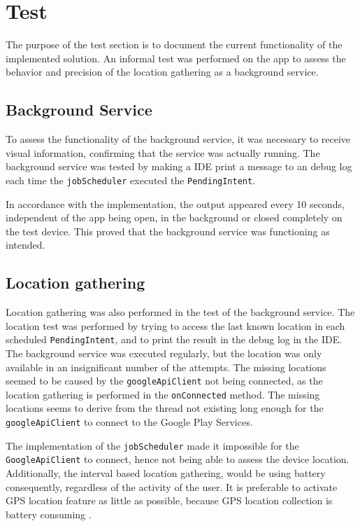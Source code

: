 \section{Test} \label{sec:s2test}
The purpose of the test section is to document the current functionality of the implemented solution.
An informal test was performed on the app to assess the behavior and precision of the location gathering as a background service.

\subsection{Background Service}
To assess the functionality of the background service, it was necessary to receive visual information, confirming that the service was actually running.
The background service was tested by making a IDE print a message to an debug log each time the \texttt{jobScheduler} executed the \texttt{PendingIntent}.

In accordance with the implementation, the output appeared every 10 seconds, independent of the app being open, in the background or closed completely on the test device.
This proved that the background service was functioning as intended.

\subsection{Location gathering} 
Location gathering was also performed in the test of the background service.
The location test was performed by trying to access the last known location in each scheduled \texttt{PendingIntent}, and to print the result in the debug log in the IDE.
The background service was executed regularly, but the location was only available in an insignificant number of the attempts.
The missing locations seemed to be caused by the \texttt{googleApiClient} not being connected, as the location gathering is performed in the \texttt{onConnected} method.
The missing locations seems to derive from the thread not existing long enough for the \texttt{googleApiClient} to connect to the Google Play Services.

The implementation of the \texttt{jobScheduler} made it impossible for the \texttt{GoogleApiClient} to connect, hence not being able to assess the device location.
Additionally, the interval based location gathering, would be using battery consequently, regardless of the activity of the user. 
It is preferable to activate GPS location feature as little as possible, because GPS location collection is battery consuming \citep{fuckGPS}.